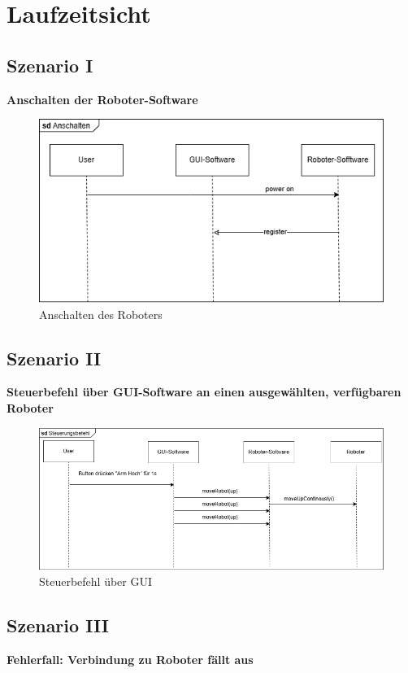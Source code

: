 \chapter{Laufzeitsicht}

\section{Szenario I}
\textbf{Anschalten der Roboter-Software}\\

\begin{figure}[h]
    \centering
    \includegraphics[width=0.8\linewidth]{diagrams/Anschalten.png}
    \caption{Anschalten des Roboters}
    \label{fig:Anschalten}
\end{figure}

\clearpage
\section{Szenario II}
\textbf{Steuerbefehl über GUI-Software an einen ausgewählten, verfügbaren Roboter}\\

\begin{figure}[h]  
    \centering
    \includegraphics[width=0.8\linewidth]{diagrams/Steuerungsbefehl.png}
    \caption{Steuerbefehl über GUI}
    \label{fig:Steuerbefehl}
\end{figure}

\clearpage
\section{Szenario III}
\textbf{Fehlerfall: Verbindung zu Roboter fällt aus}\\

